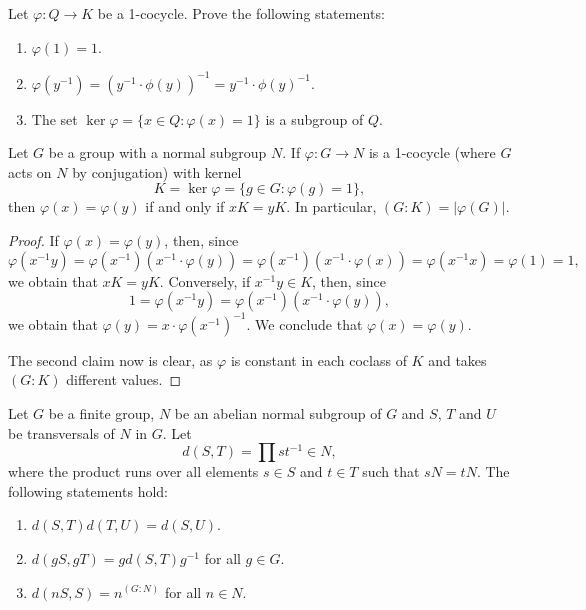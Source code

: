 \begin{exercise}
\label{xca:1cocycle}
Let $\varphi\colon Q\to K$ be a 1-cocycle. Prove the following statements:
\begin{enumerate}
	\item $\varphi(1)=1$.
	\item $\varphi(y^{-1})=(y^{-1}\cdot\phi(y))^{-1}=y^{-1}\cdot\phi(y)^{-1}$.
	\item The set $\ker\varphi=\{x\in Q:\varphi(x)=1\}$ is a subgroup of $Q$. 
\end{enumerate}
\end{exercise}

\begin{lemma}
\label{lem:1cocycle}
Let $G$ be a group with a normal subgroup $N$. 
If $\varphi\colon G\to N$ is a 1-cocycle (where $G$ acts on $N$ by conjugation)
with kernel 
\[
K=\ker\varphi=\{g\in G:\varphi(g)=1\}, 
\]
then 
$\varphi(x)=\varphi(y)$ if and only if $xK=yK$. In particular,
$(G:K)=|\varphi(G)|$. 
\end{lemma}

\begin{proof}
If $\varphi(x)=\varphi(y)$, then, since  
\[
\varphi(x^{-1}y)
=\varphi(x^{-1})(x^{-1}\cdot\varphi(y))
=\varphi(x^{-1})(x^{-1}\cdot\varphi(x))
=\varphi(x^{-1}x)=\varphi(1)
=1,
\]
we obtain that $xK=yK$. Conversely, if $x^{-1}y\in K$, then, since 
\[
1=\varphi(x^{-1}y)=\varphi(x^{-1})(x^{-1}\cdot \varphi(y)),
\]
we obtain that $\varphi(y)=x\cdot\varphi(x^{-1})^{-1}$. We conclude that 
$\varphi(x)=\varphi(y)$.

The second claim now is clear, as $\varphi$ is constant in each coclass of $K$ 
and takes $(G:K)$ different values. 
\end{proof}

\begin{lemma}
	\label{lem:d}
	Let $G$ be a finite group, $N$ be an abelian normal subgroup of $G$ and $S$, $T$ and $U$
    be transversals of $N$ in $G$. Let 
	\[
	d(S,T)=\prod st^{-1}\in N,
	\]
	where the product runs over all elements $s\in S$ and $t\in T$ such that 
	$sN=tN$. The following statements hold: 
	\begin{enumerate}
		\item $d(S,T)d(T,U)=d(S,U)$.
		\item $d(gS,gT)=gd(S,T)g^{-1}$ for all $g\in G$.
		\item $d(nS,S)=n^{(G:N)}$ for all $n\in N$.
	\end{enumerate}
\end{lemma}

